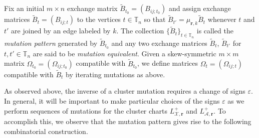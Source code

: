 \documentclass{amsart}
\numberwithin{equation}{section}
\newcommand{\bfr}{{\boldsymbol{r}}}
\newcommand{\cA}{\mathcal{A}}
\newcommand{\cX}{\mathcal{X}}
\newcommand{\TT}{\mathbb{T}}
\begin{document}
Fix an initial $m\times n$ exchange matrix $\tilde B_{t_0}=(B_{ij;t_0})$ and assign exchange matrices $\tilde B_t=(B_{ij;t})$ to the vertices $t\in\TT_n$ so that $\tilde B_{t'}=\mu_{\bfr,k}\tilde B_t$ whenever $t$ and $t'$ are joined by an edge labeled by $k$.
The collection $\{\tilde B_t\}_{t\in\TT_n}$ is called the \emph{mutation pattern} generated by $\tilde B_{t_0}$ and any two exchange matrices $\tilde B_t$, $\tilde B_{t'}$ for $t,t'\in\TT_n$ are said to be \emph{mutation equivalent}.
Given a skew-symmetric $m\times m$ matrix $\Omega_{t_0}=(\Omega_{ij;t_0})$ compatible with $\tilde B_{t_0}$, we define matrices $\Omega_t=(\Omega_{ij;t})$ compatible with $\tilde B_t$ by iterating mutations as above.

As observed above, the inverse of a cluster mutation requires a change of signs $\varepsilon$.
In general, it will be important to make particular choices of the signs $\varepsilon$ as we perform sequences of mutations for the cluster charts $L^+_{\cX,\bfr}$ and $L^+_{\cA,\bfr}$.
To accomplish this, we observe that the mutation pattern gives rise to the following combinatorial construction.
\end{document}
